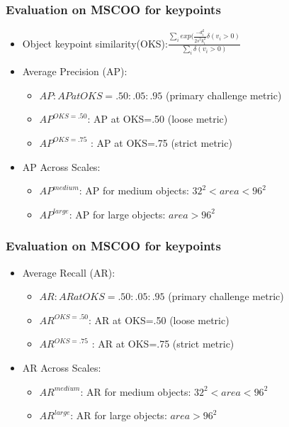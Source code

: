\documentclass{ctexbeamer}
\begin{document}
  \begin{frame}
    \frametitle{Evaluation on MSCOO for keypoints}
    \begin{itemize}
      \item  Object keypoint similarity(OKS):$\frac{\sum_i exp(\frac{-d_i^2}{2s^2k_i^2}\delta (v_i>0)}{\sum_i\delta(v_i>0)}$
      \item Average Precision (AP):
      \begin{itemize}
        \item $AP: AP at OKS=.50:.05:.95$ (primary challenge metric) 
        \item $AP^{OKS=.50}$: AP at OKS=.50 (loose metric) 
        \item $AP^{OKS=.75}$ : AP at OKS=.75 (strict metric)
      \end{itemize}
      \item AP Across Scales:
      \begin{itemize}
        \item $AP^{medium}$: AP for medium objects: $32^2 < area < 96^2$
        \item $AP^{large}$: AP for large objects: $area > 96^2$
      \end{itemize}
      
    \end{itemize}
    
  \end{frame}

  \begin{frame}
    \frametitle{Evaluation on MSCOO for keypoints}
    \begin{itemize}
      \item Average Recall (AR):
      \begin{itemize}
        \item $AR: AR at OKS=.50:.05:.95$ (primary challenge metric) 
        \item $AR^{OKS=.50}$: AR at OKS=.50 (loose metric) 
        \item $AR^{OKS=.75}$ : AR at OKS=.75 (strict metric)
      \end{itemize}
      \item AR Across Scales:
      \begin{itemize}
        \item $AR^{medium}$: AR for medium objects: $32^2 < area < 96^2$
        \item $AR^{large}$: AR for large objects: $area > 96^2$
      \end{itemize}
      
    \end{itemize}
    \vskip 1cm
  \end{frame}
\end{document}
